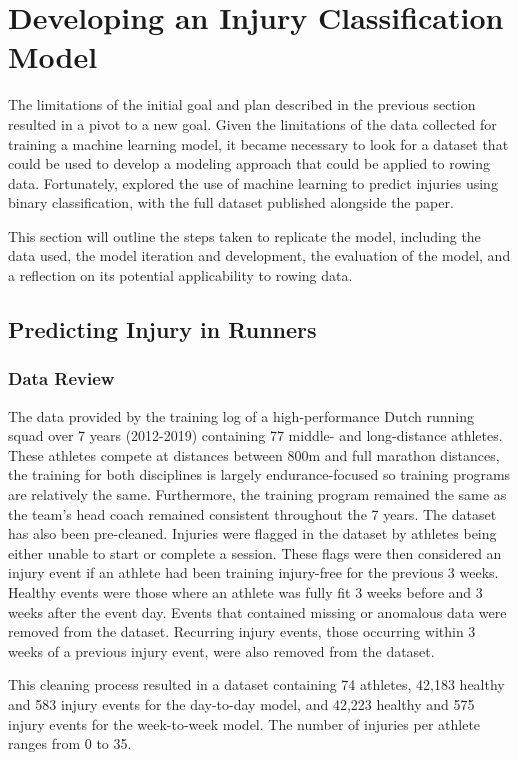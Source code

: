 \section{Developing an Injury Classification Model}
The limitations of the initial goal and plan described in the previous section resulted in a pivot to a new goal. Given the limitations of the data collected for training a machine learning model, it became necessary to look for a dataset that could be used to develop a modeling approach that could be applied to rowing data. Fortunately, \textcite{Lovdal2021} explored the use of machine learning to predict injuries using binary classification, with the full dataset published alongside the paper. 

This section will outline the steps taken to replicate the model, including the data used, the model iteration and development, the evaluation of the model, and a reflection on its potential applicability to rowing data.

\subsection{Predicting Injury in Runners}
\subsubsection{Data Review}
The data provided by \textcite{Lovdal2021} the training log of a high-performance Dutch running squad over 7 years (2012-2019) containing 77 middle- and long-distance athletes. These athletes compete at distances between 800m and full marathon distances, the training for both disciplines is largely endurance-focused so training programs are relatively the same. Furthermore, the training program remained the same as the team's head coach remained consistent throughout the 7 years. The dataset has also been pre-cleaned. Injuries were flagged in the dataset by athletes being either unable to start or complete a session. These flags were then considered an injury event if an athlete had been training injury-free for the previous 3 weeks. Healthy events were those where an athlete was fully fit 3 weeks before and 3 weeks after the event day. Events that contained missing or anomalous data were removed from the dataset. Recurring injury events, those occurring within 3 weeks of a previous injury event, were also removed from the dataset.

This cleaning process resulted in a dataset containing 74 athletes, 42,183 healthy and 583 injury events for the day-to-day model, and 42,223 healthy and 575 injury events for the week-to-week model. The number of injuries per athlete ranges from 0 to 35.

